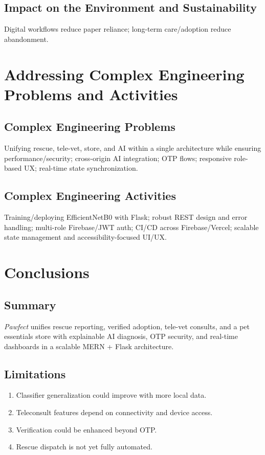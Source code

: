 \documentclass[12pt,a4paper]{report}
\numberwithin{figure}{chapter}
\numberwithin{table}{chapter}
\begin{document}
\section{Impact on the Environment and Sustainability}
Digital workflows reduce paper reliance; long-term care/adoption reduce abandonment.

\chapter{Addressing Complex Engineering Problems and Activities}\label{chap:cep}

\section{Complex Engineering Problems}
Unifying rescue, tele-vet, store, and AI within a single architecture while ensuring performance/security; cross-origin AI integration; OTP flows; responsive role-based UX; real-time state synchronization.

\section{Complex Engineering Activities}
Training/deploying EfficientNetB0 with Flask; robust REST design and error handling; multi-role Firebase/JWT auth; CI/CD across Firebase/Vercel; scalable state management and accessibility-focused UI/UX.

\chapter{Conclusions}\label{chap:conclusion}

\section{Summary}
\textit{Pawfect} unifies rescue reporting, verified adoption, tele-vet consults, and a pet essentials store with explainable AI diagnosis, OTP security, and real-time dashboards in a scalable MERN + Flask architecture.

\section{Limitations}
\begin{enumerate}
  \item Classifier generalization could improve with more local data.
  \item Teleconsult features depend on connectivity and device access.
  \item Verification could be enhanced beyond OTP.
  \item Rescue dispatch is not yet fully automated.
\end{enumerate}
\end{document}
